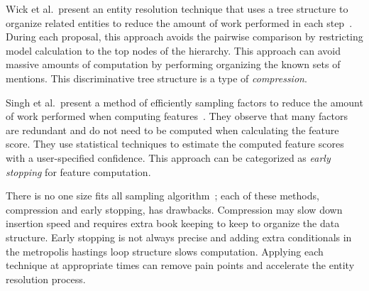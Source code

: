 Wick et al.\ present an entity resolution technique that uses a tree structure
to organize related entities to reduce the amount of work performed in each step~\cite{wick2013discriminative}.
During each proposal, this approach avoids the pairwise comparison by restricting model calculation to the top nodes of the hierarchy.
This approach can avoid massive amounts of computation by performing organizing the known sets of mentions.
This discriminative tree structure is a type of \textit{compression}.

Singh et al.\ present a method of efficiently sampling factors to reduce the
amount of work performed when computing features~\cite{singh2012monte}.
They observe that many factors are redundant and do not need to be computed when calculating the feature score.
They use statistical techniques to estimate the computed feature scores with a user-specified confidence.
This approach can be categorized as \textit{early stopping} for feature computation.

There is no one size fits all sampling algorithm~\cite{sculley2006compression};
each of these methods, compression and early stopping, has drawbacks.
Compression may slow down insertion speed and requires extra book keeping to keep to organize the data structure.
Early stopping is not always precise and adding extra conditionals in the metropolis hastings loop structure slows computation.
Applying each technique at appropriate times can remove pain points and accelerate the entity resolution process.

